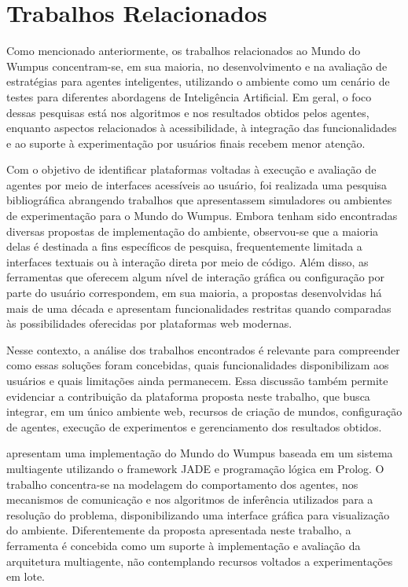 \section{Trabalhos Relacionados}

Como mencionado anteriormente, os trabalhos relacionados ao Mundo do Wumpus concentram-se, em sua maioria, no desenvolvimento e na avaliação de estratégias para agentes inteligentes, utilizando o ambiente como um cenário de testes para diferentes abordagens de Inteligência Artificial. Em geral, o foco dessas pesquisas está nos algoritmos e nos resultados obtidos pelos agentes, enquanto aspectos relacionados à acessibilidade, à integração das funcionalidades e ao suporte à experimentação por usuários finais recebem menor atenção.

Com o objetivo de identificar plataformas voltadas à execução e avaliação de agentes por meio de interfaces acessíveis ao usuário, foi realizada uma pesquisa bibliográfica abrangendo trabalhos que apresentassem simuladores ou ambientes de experimentação para o Mundo do Wumpus. Embora tenham sido encontradas diversas propostas de implementação do ambiente, observou-se que a maioria delas é destinada a fins específicos de pesquisa, frequentemente limitada a interfaces textuais ou à interação direta por meio de código. Além disso, as ferramentas que oferecem algum nível de interação gráfica ou configuração por parte do usuário correspondem, em sua maioria, a propostas desenvolvidas há mais de uma década e apresentam funcionalidades restritas quando comparadas às possibilidades oferecidas por plataformas web modernas.

Nesse contexto, a análise dos trabalhos encontrados é relevante para compreender como essas soluções foram concebidas, quais funcionalidades disponibilizam aos usuários e quais limitações ainda permanecem. Essa discussão também permite evidenciar a contribuição da plataforma proposta neste trabalho, que busca integrar, em um único ambiente web, recursos de criação de mundos, configuração de agentes, execução de experimentos e gerenciamento dos resultados obtidos.

\cite{julien2015wumpus} apresentam uma implementação do Mundo do Wumpus baseada em um sistema multiagente utilizando o framework JADE e programação lógica em Prolog. O trabalho concentra-se na modelagem do comportamento dos agentes, nos mecanismos de comunicação e nos algoritmos de inferência utilizados para a resolução do problema, disponibilizando uma interface gráfica para visualização do ambiente. Diferentemente da proposta apresentada neste trabalho, a ferramenta é concebida como um suporte à implementação e avaliação da arquitetura multiagente, não contemplando recursos voltados a experimentações em lote.

